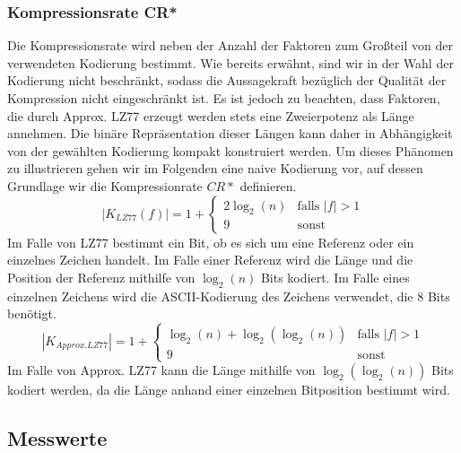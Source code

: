 \subsubsection{Kompressionsrate CR*} \label{cr}
Die Kompressionsrate wird neben der Anzahl der Faktoren zum Großteil von der verwendeten Kodierung bestimmt. Wie bereits erwähnt, sind wir in der Wahl der Kodierung
nicht beschränkt, sodass die Aussagekraft bezüglich der Qualität der Kompression nicht eingeschränkt ist. Es ist jedoch zu beachten, dass Faktoren, die durch Approx. LZ77
erzeugt werden stets eine Zweierpotenz als Länge annehmen. Die binäre Repräsentation dieser Längen kann daher in Abhängigkeit von der gewählten Kodierung kompakt 
konstruiert werden. Um dieses Phänomen zu illustrieren gehen wir im Folgenden eine naive Kodierung vor, auf dessen Grundlage wir die Kompressionrate $CR*$ definieren.
\begin{equation}
    |K_{LZ77}(f)| = 1 + \begin{cases}
        2\log_2(n) & \text{falls } |f| > 1 \\
        9 & \text{sonst}
    \end{cases}
\end{equation}
Im Falle von LZ77 bestimmt ein Bit, ob es sich um eine Referenz oder ein einzelnes Zeichen handelt. Im Falle einer Referenz wird die Länge und die Position der Referenz
mithilfe von $\log_2(n)$ Bits kodiert. Im Falle eines einzelnen Zeichens wird die ASCII-Kodierung des Zeichens verwendet, die 8 Bits benötigt.
\begin{equation}
    |K_{Approx.LZ77}|= 1 + \begin{cases}
        \log_2(n)+\log_2(\log_2(n)) & \text{falls } |f| > 1 \\
        9 & \text{sonst}
    \end{cases}
\end{equation}
Im Falle von Approx. LZ77 kann die Länge mithilfe von $\log_2(\log_2(n))$ Bits kodiert werden, da die Länge anhand einer einzelnen Bitposition bestimmt wird.

\newpage
\subsection{Messwerte}

